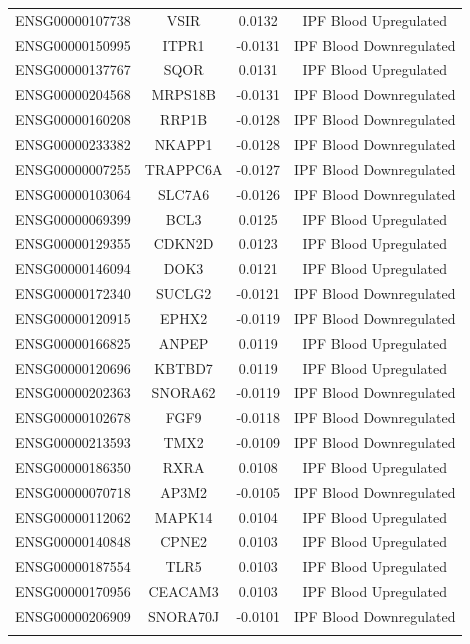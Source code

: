 \documentclass[
]{article}
\begin{document}
\begin{singlespace}
\begin{longtable}[t]{lccc}
\addlinespace
ENSG00000107738 & VSIR & 0.0132 & IPF Blood Upregulated\\
ENSG00000150995 & ITPR1 & -0.0131 & IPF Blood Downregulated\\
ENSG00000137767 & SQOR & 0.0131 & IPF Blood Upregulated\\
ENSG00000204568 & MRPS18B & -0.0131 & IPF Blood Downregulated\\
ENSG00000160208 & RRP1B & -0.0128 & IPF Blood Downregulated\\
\addlinespace
ENSG00000233382 & NKAPP1 & -0.0128 & IPF Blood Downregulated\\
ENSG00000007255 & TRAPPC6A & -0.0127 & IPF Blood Downregulated\\
ENSG00000103064 & SLC7A6 & -0.0126 & IPF Blood Downregulated\\
ENSG00000069399 & BCL3 & 0.0125 & IPF Blood Upregulated\\
ENSG00000129355 & CDKN2D & 0.0123 & IPF Blood Upregulated\\
\addlinespace
ENSG00000146094 & DOK3 & 0.0121 & IPF Blood Upregulated\\
ENSG00000172340 & SUCLG2 & -0.0121 & IPF Blood Downregulated\\
ENSG00000120915 & EPHX2 & -0.0119 & IPF Blood Downregulated\\
ENSG00000166825 & ANPEP & 0.0119 & IPF Blood Upregulated\\
ENSG00000120696 & KBTBD7 & 0.0119 & IPF Blood Upregulated\\
\addlinespace
ENSG00000202363 & SNORA62 & -0.0119 & IPF Blood Downregulated\\
ENSG00000102678 & FGF9 & -0.0118 & IPF Blood Downregulated\\
ENSG00000213593 & TMX2 & -0.0109 & IPF Blood Downregulated\\
ENSG00000186350 & RXRA & 0.0108 & IPF Blood Upregulated\\
ENSG00000070718 & AP3M2 & -0.0105 & IPF Blood Downregulated\\
\addlinespace
ENSG00000112062 & MAPK14 & 0.0104 & IPF Blood Upregulated\\
ENSG00000140848 & CPNE2 & 0.0103 & IPF Blood Upregulated\\
ENSG00000187554 & TLR5 & 0.0103 & IPF Blood Upregulated\\
ENSG00000170956 & CEACAM3 & 0.0103 & IPF Blood Upregulated\\
ENSG00000206909 & SNORA70J & -0.0101 & IPF Blood Downregulated\\
\addlinespace

\end{longtable}
\end{singlespace}
\end{document}
